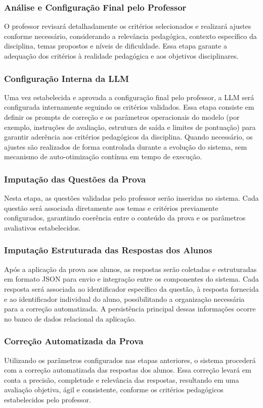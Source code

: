 \subsubsection{Análise e Configuração Final pelo Professor}
O professor revisará detalhadamente os critérios selecionados e realizará ajustes conforme necessário, considerando a relevância pedagógica, contexto específico da disciplina, temas propostos e níveis de dificuldade. Essa etapa garante a adequação dos critérios à realidade pedagógica e aos objetivos disciplinares.

\subsubsection{Configuração Interna da LLM}
Uma vez estabelecida e aprovada a configuração final pelo professor, a LLM será configurada internamente seguindo os critérios validados. Essa etapa consiste em definir os prompts de correção e os parâmetros operacionais do modelo (por exemplo, instruções de avaliação, estrutura de saída e limites de pontuação) para garantir aderência aos critérios pedagógicos da disciplina. Quando necessário, os ajustes são realizados de forma controlada durante a evolução do sistema, sem mecanismo de auto-otimização contínua em tempo de execução.

\subsubsection{Imputação das Questões da Prova}
Nesta etapa, as questões validadas pelo professor serão inseridas no sistema. Cada questão será associada diretamente aos temas e critérios previamente configurados, garantindo coerência entre o conteúdo da prova e os parâmetros avaliativos estabelecidos.

\subsubsection{Imputação Estruturada das Respostas dos Alunos}
Após a aplicação da prova aos alunos, as respostas serão coletadas e estruturadas em formato JSON para envio e integração entre os componentes do sistema. Cada resposta será associada ao identificador específico da questão, à resposta fornecida e ao identificador individual do aluno, possibilitando a organização necessária para a correção automatizada. A persistência principal dessas informações ocorre no banco de dados relacional da aplicação.

\subsubsection{Correção Automatizada da Prova}
Utilizando os parâmetros configurados nas etapas anteriores, o sistema procederá com a correção automatizada das respostas dos alunos. Essa correção levará em conta a precisão, completude e relevância das respostas, resultando em uma avaliação objetiva, ágil e consistente, conforme os critérios pedagógicos estabelecidos pelo professor.

